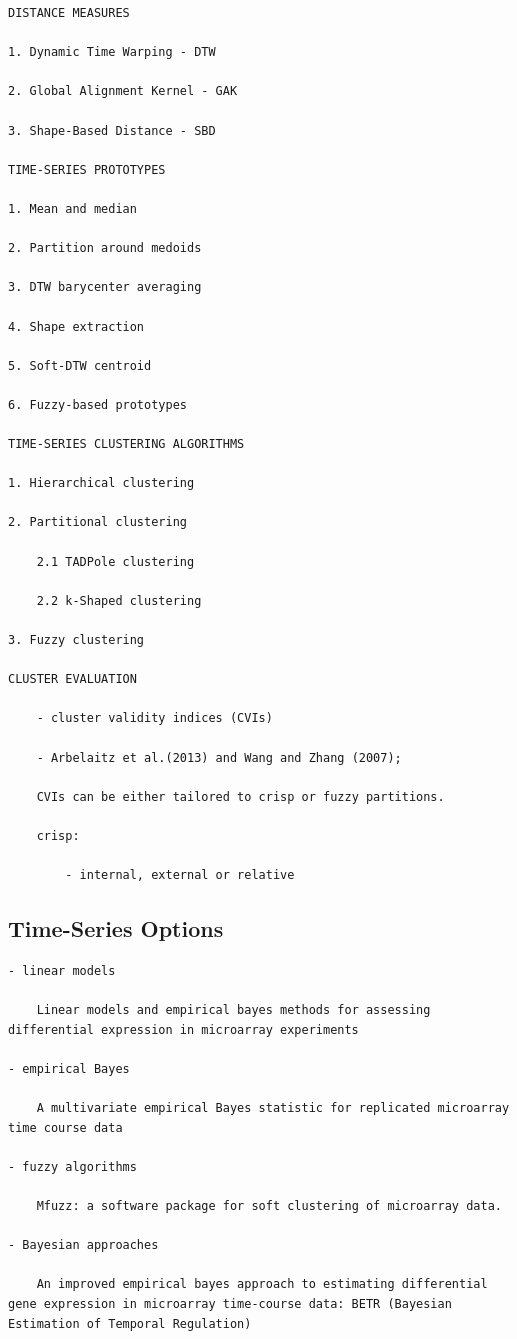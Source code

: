 \documentclass[
]{book}
\begin{document}
\begin{verbatim}
DISTANCE MEASURES

1. Dynamic Time Warping - DTW

2. Global Alignment Kernel - GAK

3. Shape-Based Distance - SBD

TIME-SERIES PROTOTYPES

1. Mean and median

2. Partition around medoids

3. DTW barycenter averaging

4. Shape extraction

5. Soft-DTW centroid

6. Fuzzy-based prototypes

TIME-SERIES CLUSTERING ALGORITHMS

1. Hierarchical clustering

2. Partitional clustering

    2.1 TADPole clustering

    2.2 k-Shaped clustering

3. Fuzzy clustering 

CLUSTER EVALUATION

    - cluster validity indices (CVIs)

    - Arbelaitz et al.(2013) and Wang and Zhang (2007);

    CVIs can be either tailored to crisp or fuzzy partitions.

    crisp:

        - internal, external or relative
\end{verbatim}

\hypertarget{time-series-options}{%
\subsection{Time-Series Options}\label{time-series-options}}

\begin{verbatim}
- linear models

    Linear models and empirical bayes methods for assessing differential expression in microarray experiments

- empirical Bayes

    A multivariate empirical Bayes statistic for replicated microarray time course data

- fuzzy algorithms

    Mfuzz: a software package for soft clustering of microarray data.

- Bayesian approaches

    An improved empirical bayes approach to estimating differential gene expression in microarray time-course data: BETR (Bayesian Estimation of Temporal Regulation)
\end{verbatim}
\end{document}
